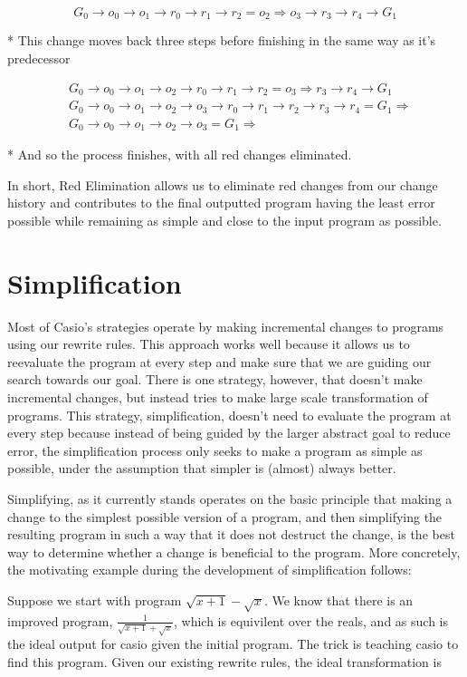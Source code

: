 \documentclass{article}
\newcommand{\insetarrow}[1]{=#1\Rightarrow}
\begin{document}
\[G_0\to o_0\to o_1\to r_0
\to r_1 \to r_2 \insetarrow{o_2} o_3 
\to r_3\to r_4 \to G_1\]

* This change moves back three steps 
before finishing in the same way as it's predecessor

\begin{align*}
&G_0\to o_0\to o_1\to o_2
\to r_0\to r_1 \to r_2 \insetarrow{o_3} 
r_3\to r_4 \to G_1\\
&G_0\to o_0\to o_1\to o_2
\to o_3 \to r_0 \to r_1\to r_2
\to r_3 \to r_4 \insetarrow{G_1}\\
&G_0\to o_0\to o_1\to o_2
\to o_3 \insetarrow{G_1}
\end{align*}

* And so the process finishes, 
with all red changes eliminated.

In short, 
Red Elimination allows us to eliminate
red changes from our change history 
and contributes to the final outputted 
program having the least error possible 
while remaining as simple 
and close to the input program 
as possible.

\section{Simplification}

Most of Casio's strategies 
operate by making incremental changes 
to programs using our rewrite rules. 
This approach works well 
because it allows us to reevaluate the program 
at every step 
and make sure that we are guiding our search 
towards our goal. 
There is one strategy, however, 
that doesn't make incremental changes, 
but instead tries to make 
large scale transformation of programs. 
This strategy, simplification, 
doesn't need to evaluate 
the program at every step 
because instead of being guided 
by the larger abstract goal 
to reduce error, 
the simplification process only seeks 
to make a program as simple as possible, 
under the assumption that 
simpler is (almost) always better.

Simplifying, 
as it currently stands 
operates on the basic principle 
that making a change to the 
simplest possible version of a program, 
and then simplifying the resulting program 
in such a way that 
it does not destruct the change, 
is the best way to determine 
whether a change is beneficial 
to the program. 
More concretely, 
the motivating example during 
the development of simplification follows:

Suppose we start with program $\sqrt{x+1} - \sqrt{x}$. 
We know that there is an improved program, 
$\frac{1}{\sqrt{x+1} + \sqrt{x}}$, 
which is equivilent over the reals, 
and as such is the ideal output 
for casio given the initial program. 
The trick is teaching casio 
to find this program. 
Given our existing rewrite rules, 
the ideal transformation is 
\end{document}

